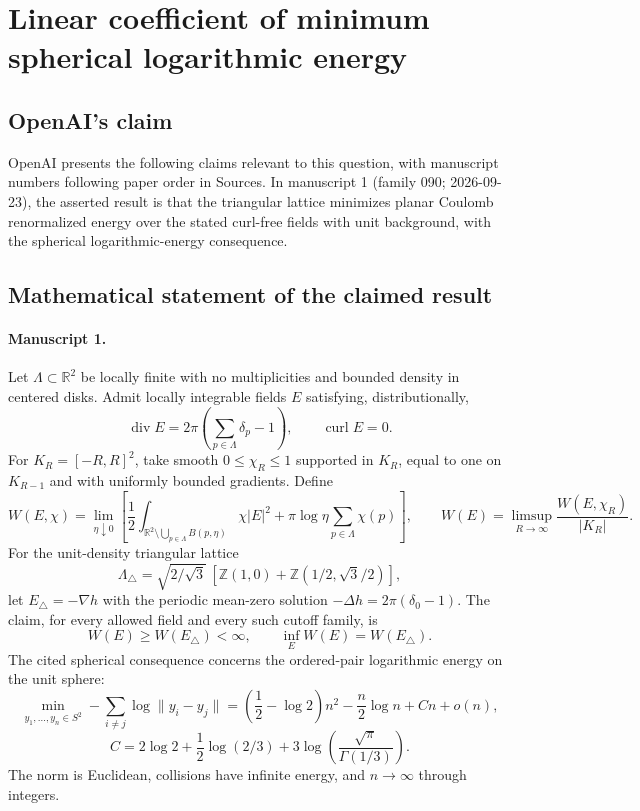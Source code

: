 \documentclass[11pt]{article}
\begin{document}
\section*{Linear coefficient of minimum spherical logarithmic energy}

\subsection{OpenAI's claim}
OpenAI presents the following claims relevant to this question, with manuscript numbers following paper order in Sources. In manuscript 1 (family 090; 2026-09-23), the asserted result is that the triangular lattice minimizes planar Coulomb renormalized energy over the stated curl-free fields with unit background, with the spherical logarithmic-energy consequence.

\subsection{Mathematical statement of the claimed result}
\paragraph{Manuscript 1.}
Let $\Lambda\subset\mathbb R^2$ be locally finite with no multiplicities and bounded density in centered disks. Admit locally integrable fields $E$ satisfying, distributionally,
\[
 \operatorname{div}E=2\pi(\sum_{p\in\Lambda}\delta_p-1),\qquad
 \operatorname{curl}E=0.
\]
For $K_R=[-R,R]^2$, take smooth $0\le\chi_R\le1$ supported in $K_R$, equal to one on $K_{R-1}$ and with uniformly bounded gradients. Define
\[
 W(E,\chi)=\lim_{\eta\downarrow0}
 \left[\frac12\int_{\mathbb R^2\setminus\bigcup_{p\in\Lambda}B(p,\eta)}\chi|E|^2
       +\pi\log\eta\sum_{p\in\Lambda}\chi(p)\right],
 \qquad W(E)=\limsup_{R\to\infty}\frac{W(E,\chi_R)}{|K_R|}.
\]
For the unit-density triangular lattice
\[
 \Lambda_{\triangle}=\sqrt{2/\sqrt3}\,[\mathbb Z(1,0)+\mathbb Z(1/2,\sqrt3/2)],
\]
let $E_{\triangle}=-\nabla h$ with the periodic mean-zero solution $-\Delta h=2\pi(\delta_0-1)$. The claim, for every allowed field and every such cutoff family, is
\[
 W(E)\ge W(E_{\triangle})<\infty,
 \qquad\inf_E W(E)=W(E_{\triangle}).
\]
The cited spherical consequence concerns the ordered-pair logarithmic energy on the unit sphere:
\[
 \min_{y_1,\ldots,y_n\in S^2}-\sum_{i\ne j}\log\|y_i-y_j\|
 =\left(\frac12-\log2\right)n^2-\frac n2\log n+C n+o(n),
\]
\[
 C=2\log2+\frac12\log(2/3)
           +3\log\left(\frac{\sqrt\pi}{\Gamma(1/3)}\right).
\]
The norm is Euclidean, collisions have infinite energy, and $n\to\infty$ through integers.
\end{document}
